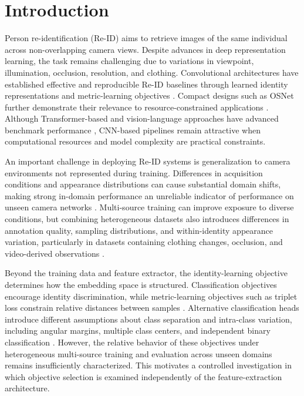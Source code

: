\documentclass{llncs}
\begin{document}



\section{Introduction}
\label{sec:intro}

Person re-identification (Re-ID) aims to retrieve images of the same individual across non-overlapping camera views. Despite advances in deep representation learning, the task remains challenging due to variations in viewpoint, illumination, occlusion, resolution, and clothing. Convolutional architectures have established effective and reproducible Re-ID baselines through learned identity representations and metric-learning objectives \cite{luo2019bag,sun2018beyond,song2020strong}. Compact designs such as OSNet further demonstrate their relevance to resource-constrained applications \cite{zhou2022learning}. Although Transformer-based and vision-language approaches have advanced benchmark performance \cite{he2021transreid,li2023clip,chen2023beyond}, CNN-based pipelines remain attractive when computational resources and model complexity are practical constraints.

An important challenge in deploying Re-ID systems is generalization to camera environments not represented during training. Differences in acquisition conditions and appearance distributions can cause substantial domain shifts, making strong in-domain performance an unreliable indicator of performance on unseen camera networks \cite{zhou2021mix,lee2025domain}. Multi-source training can improve exposure to diverse conditions, but combining heterogeneous datasets also introduces differences in annotation quality, sampling distributions, and within-identity appearance variation, particularly in datasets containing clothing changes, occlusion, and video-derived observations \cite{shu2022last,xu2023deepchange}.

Beyond the training data and feature extractor, the identity-learning objective determines how the embedding space is structured. Classification objectives encourage identity discrimination, while metric-learning objectives such as triplet loss constrain relative distances between samples \cite{hermans2017triplet}. Alternative classification heads introduce different assumptions about class separation and intra-class variation, including angular margins, multiple class centers, and independent binary classification \cite{deng2019arcface,deng2020subcenter,wen2022sphereface2}. However, the relative behavior of these objectives under heterogeneous multi-source training and evaluation across unseen domains remains insufficiently characterized. This motivates a controlled investigation in which objective selection is examined independently of the feature-extraction architecture.
\end{document}
